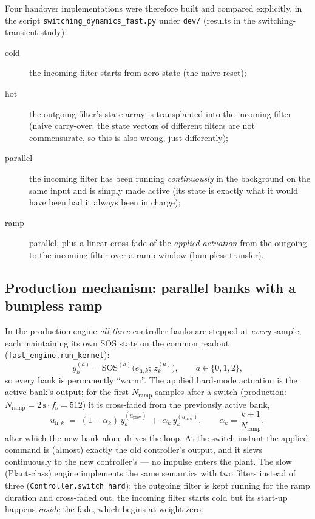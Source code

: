 \documentclass[11pt,a4paper]{article}
\newcommand{\code}[1]{\texttt{#1}}
\newcommand{\fs}{f_{\mathrm{s}}}
\begin{document}
Four handover implementations were therefore built and compared explicitly, in the
script \code{switching\_dynamics\_fast.py} under \code{dev/} (results in the
switching-transient study):
\begin{description}
  \item[cold] the incoming filter starts from zero state (the naive reset);
  \item[hot]  the outgoing filter's state array is transplanted into the incoming filter
              (naive carry-over; the state vectors of different filters are not
              commensurate, so this is also wrong, just differently);
  \item[parallel] the incoming filter has been running \emph{continuously} in the
              background on the same input and is simply made active (its state is
              exactly what it would have been had it always been in charge);
  \item[ramp] parallel, plus a linear cross-fade of the \emph{applied actuation} from the
              outgoing to the incoming filter over a ramp window (bumpless transfer).
\end{description}

\subsection{Production mechanism: parallel banks with a bumpless ramp}
\label{sec:banks}

In the production engine \emph{all three} controller banks are stepped at \emph{every}
sample, each maintaining its own SOS state on the common readout
(\code{fast\_engine.run\_kernel}):
\begin{equation}
  y^{(a)}_k = \mathrm{SOS}^{(a)}\!\big(e_{\mathrm h,k};\, z^{(a)}_k\big),
  \qquad a \in \{0,1,2\},
\end{equation}
so every bank is permanently ``warm''. The applied hard-mode actuation is the active
bank's output; for the first $N_{\mathrm{ramp}}$ samples after a switch
(production: $N_{\mathrm{ramp}} = 2\,\mathrm{s}\cdot\fs = 512$) it is cross-faded from
the previously active bank,
\begin{equation}
  \label{eq:ramp}
  u_{\mathrm h,k} \;=\; (1-\alpha_k)\, y^{(a_{\mathrm{prev}})}_k
                 \;+\; \alpha_k\, y^{(a_{\mathrm{new}})}_k,
  \qquad \alpha_k = \frac{k+1}{N_{\mathrm{ramp}}},
\end{equation}
after which the new bank alone drives the loop. At the switch instant the applied
command is (almost) exactly the old controller's output, and it slews continuously to
the new controller's --- no impulse enters the plant. The slow (Plant-class) engine
implements the same semantics with two filters instead of three
(\code{Controller.switch\_hard}): the outgoing filter is kept running for the ramp
duration and cross-faded out, the incoming filter starts cold but its start-up happens
\emph{inside} the fade, which begins at weight zero.
\end{document}
